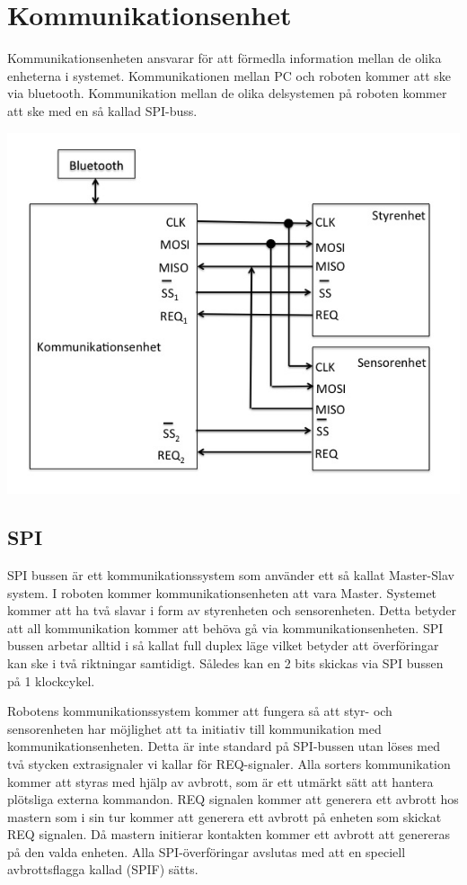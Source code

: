 \section{Kommunikationsenhet}

Kommunikationsenheten ansvarar för att förmedla information mellan de olika enheterna i systemet. 
Kommunikationen mellan PC och roboten kommer att ske via bluetooth. Kommunikation mellan de olika delsystemen på roboten kommer att ske med en så kallad SPI-buss.

\includegraphics[angle=0,scale=0.5]{bilder/SPI-buss.png}



\subsection{SPI}
SPI bussen är ett kommunikationssystem som använder ett så kallat Master-Slav system. I roboten kommer kommunikationsenheten att vara Master. Systemet kommer att ha två slavar i form av styrenheten och sensorenheten.
Detta betyder att all kommunikation kommer att behöva gå via kommunikationsenheten. SPI bussen arbetar alltid i så kallat full duplex läge vilket betyder att överföringar kan ske i två riktningar samtidigt. Således kan en 2 bits skickas via SPI bussen på 1 klockcykel. 

Robotens kommunikationssystem kommer att fungera så att styr- och sensorenheten har möjlighet att ta initiativ till kommunikation med kommunikationsenheten. Detta är inte standard på SPI-bussen utan löses med två stycken extrasignaler vi kallar för REQ-signaler. Alla sorters kommunikation kommer att styras med hjälp av avbrott, som är ett utmärkt sätt att hantera plötsliga externa kommandon. REQ signalen kommer att generera ett avbrott hos mastern som i sin tur kommer att generera ett avbrott på enheten som skickat REQ signalen. Då mastern initierar kontakten kommer ett avbrott att genereras på den valda enheten. Alla SPI-överföringar avslutas med att en speciell avbrottsflagga kallad (SPIF) sätts.

